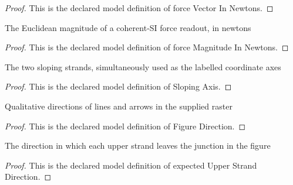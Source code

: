 \begin{proof}
  This is the declared model definition of force Vector In Newtons.
\end{proof}
\begin{definition}
  \label{def:physics:phyx-mini-0681:phyxminiproblems-problemphyxmini0681-forcemagnitudeinnewtons}
  The Euclidean magnitude of a coherent-SI force readout, in newtons
\end{definition}
\begin{proof}
  This is the declared model definition of force Magnitude In Newtons.
\end{proof}
\begin{definition}
  \label{def:physics:phyx-mini-0681:phyxminiproblems-problemphyxmini0681-slopingaxis}
  The two sloping strands, simultaneously used as the labelled coordinate axes
\end{definition}
\begin{proof}
  This is the declared model definition of Sloping Axis.
\end{proof}
\begin{definition}
  \label{def:physics:phyx-mini-0681:phyxminiproblems-problemphyxmini0681-figuredirection}
  Qualitative directions of lines and arrows in the supplied raster
\end{definition}
\begin{proof}
  This is the declared model definition of Figure Direction.
\end{proof}
\begin{definition}
  \label{def:physics:phyx-mini-0681:phyxminiproblems-problemphyxmini0681-expectedupperstranddirection}
  The direction in which each upper strand leaves the junction in the figure
\end{definition}
\begin{proof}
  This is the declared model definition of expected Upper Strand Direction.
\end{proof}
